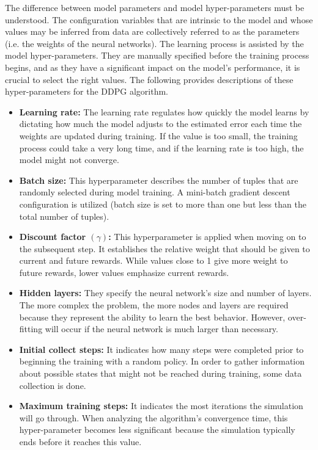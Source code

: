 \documentclass[12pt,twoside,a4]{mwbk}
\begin{document}
\noindent The difference between model parameters and model hyper-parameters must be understood. The configuration variables that are intrinsic to the model and whose values may be inferred from data are collectively referred to as the parameters (i.e. the weights of the neural networks). The learning process is assisted by the model hyper-parameters. They are manually specified before the training process begins, and as they have a significant impact on the model's performance, it is crucial to select the right values. The following provides descriptions of these hyper-parameters for the DDPG algorithm.
\begin{itemize}
    \item \textbf{Learning rate:} The learning rate regulates how quickly the model learns by dictating how much the model adjusts to the estimated error each time the weights are updated during training. If the value is too small, the training process could take a very long time, and if the learning rate is too high, the model might not converge.
    
    \item \textbf{Batch size:} This hyperparameter describes the number of tuples that are randomly selected during model training. A mini-batch gradient descent configuration is utilized (batch size is set to more than one but less than the total number of tuples).
    
    \item \textbf{Discount factor $(\gamma)$:} This hyperparameter is applied when moving on to the subsequent step. It establishes the relative weight that should be given to current and future rewards. While values close to 1 give more weight to future rewards, lower values emphasize current rewards.
    
    \item \textbf{Hidden layers:} They specify the neural network's size and number of layers. The more complex the problem, the more nodes and layers are required because they represent the ability to learn the best behavior. However, over-fitting will occur if the neural network is much larger than necessary.
    
    \item \textbf{Initial collect steps:} It indicates how many steps were completed prior to beginning the training with a random policy. In order to gather information about possible states that might not be reached during training, some data collection is done.
    
    \item \textbf{Maximum training steps:} It indicates the most iterations the simulation will go through. When analyzing the algorithm's convergence time, this hyper-parameter becomes less significant because the simulation typically ends before it reaches this value.
    

\end{itemize}
\end{document}
